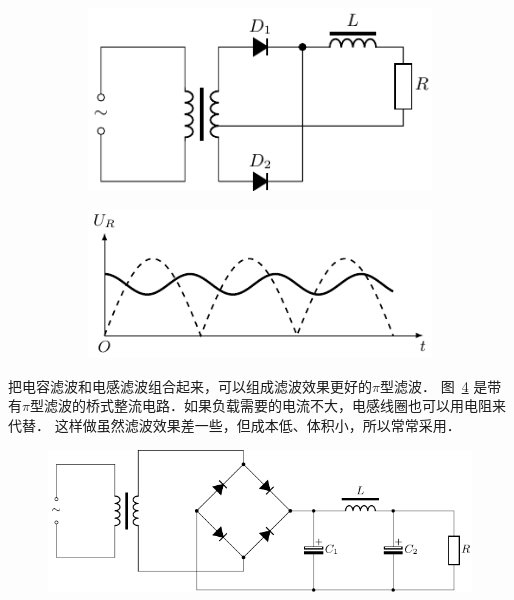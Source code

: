 \begin{figure}[htbp]
	\centering
	\begin{subfigure}{0.4\linewidth}
		\centering
		\includegraphics{fig/C/3-38a.pdf}
		\caption{}\label{fig_C_3-38a}
	\end{subfigure}
	\hfil
	\begin{subfigure}{0.4\linewidth}
		\centering
		\includegraphics{fig/C/3-38b.pdf}
		\caption{}\label{fig_C_3-38b}
	\end{subfigure}
	\caption{}\label{fig_C_3-38}
\end{figure}


把电容滤波和电感滤波组合起来，可以组成滤波效果更好的$\pi$型滤波．
图~\ref{fig_C_3-39} 是带有$\pi$型滤波的桥式整流电路．如果负载需要的电流不大，电感线圈也可以用电阻来代替．
这样做虽然滤波效果差一些，但成本低、体积小，所以常常采用．
\begin{figure}[htbp]
    \centering
    \includegraphics{fig/C/3-39.pdf}
    \caption{}\label{fig_C_3-39}
\end{figure}

